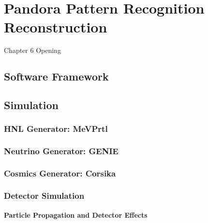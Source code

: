\chapter{Pandora Pattern Recognition Reconstruction}

\ifpdf
    \graphicspath{{Chapter6/Figs/Raster/}{Chapter6/Figs/PDF/}{Chapter6/Figs/}}
\else
    \graphicspath{{Chapter6/Figs/Vector/}{Chapter6/Figs/}}
\fi


Chapter 6 Opening


\section{Software Framework}

\section{Simulation}
\subsection{HNL Generator: MeVPrtl}
\subsection{Neutrino Generator: GENIE}
\subsection{Cosmics Generator: Corsika}
\subsection{Detector Simulation}
\subsubsection{Particle Propagation and Detector Effects}

